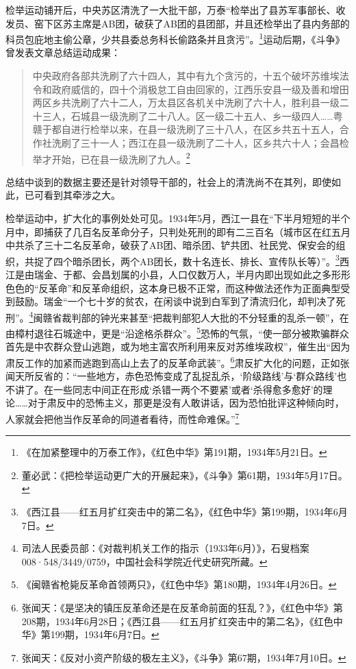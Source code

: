 检举运动铺开后，中央苏区清洗了一大批干部，万泰“检举出了县苏军事部长、收发员、窑下区苏主席是AB团，破获了AB团的县团部，并且还检举出了县内务部的科员包庇地主偷公章，少共县委总务科长偷路条并且贪污”。\footnote{《在加紧整理中的万泰工作》，《红色中华》第191期，1934年5月21日。}运动后期，《斗争》曾发表文章总结运动成果：

\begin{quote}

中央政府各部共洗刷了六十四人，其中有九个贪污的，十五个破坏苏维埃法令和政府威信的，四十个消极怠工自由回家的，江西乐安县一级及善和增田两区乡共洗刷了六十二人，万太县区各机关中洗刷了六十人，胜利县一级二十三人，石城县一级洗刷了二十八人。区一级二十五人、乡一级四人……粤赣于都自进行检举以来，在县一级洗刷了三十八人，在区乡共五十五人，合作社洗刷了三十一人；西江在县一级洗刷了二十人，区乡共六十人；会昌检举才开始，已在县一级洗刷了九人。\footnote{董必武：《把检举运动更广大的开展起来》，《斗争》第61期，1934年5月17日。}
\end{quote}


总结中谈到的数据主要还是针对领导干部的，社会上的清洗尚不在其列，即使如此，已可看到其牵涉之大。


检举运动中，扩大化的事例处处可见。1934年5月，西江一县在“下半月短短的半个月中，即捕获了几百名反革命分子，只判处死刑的即有二三百名（城市区在红五月中共杀了三十二名反革命，破获了AB团、暗杀团、铲共团、社民党、保安会的组织，共捉了四个暗杀团长，两个AB团长，数十名连长、排长、宣传队长等）”。\footnote{《西江县——红五月扩红突击中的第二名》，《红色中华》第199期，1934年6月7日。}西江是由瑞金、于都、会昌划属的小县，人口仅数万人，半月内即出现如此之多形形色色的“反革命”和反革命组织，这本身已极不正常，而这种做法还作为正面典型受到鼓励。瑞金“一个七十岁的贫农，在闲谈中说到白军到了清流归化，却判决了死刑”。\footnote{司法人民委员部：《对裁判机关工作的指示（1933年6月）》，石叟档案008·548/3449/0759，中国社会科学院近代史研究所藏。}闽赣省裁判部的钟光来甚至“把裁判部犯人大批的不分轻重的乱杀一顿”，在由樟村退往石城途中，更是“沿途格杀群众”。\footnote{《闽赣省枪毙反革命首领两只》，《红色中华》第180期，1934年4月26日。}恐怖的气氛，“使一部分被欺骗群众首先是中农群众登山逃跑，或为地主富农所利用来反对苏维埃政权”，催生出“因为肃反工作的加紧而逃跑到高山上去了的反革命武装”。\footnote{张闻天：《是坚决的镇压反革命还是在反革命前面的狂乱？》，《红色中华》第208期，1934年6月28日；《西江县——红五月扩红突击中的第二名》，《红色中华》第199期，1934年6月7日。}肃反扩大化的问题，正如张闻天所反省的：“一些地方，赤色恐怖变成了乱捉乱杀，‘阶级路线’与‘群众路线’也不讲了。在一些同志中间正在形成‘杀错一两个不要紧’或者‘杀得愈多愈好’的理论……对于肃反中的恐怖主义，那更是没有人敢讲话，因为恐怕批评这种倾向时，人家就会把他当作反革命的同道者看待，而性命难保。”\footnote{张闻天：《反对小资产阶级的极左主义》，《斗争》第67期，1934年7月10日。}


